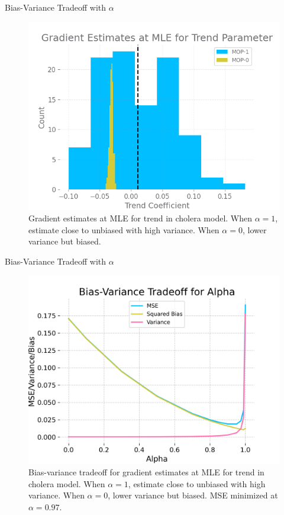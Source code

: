 \documentclass{beamer}
\begin{document}
\begin{frame}{Bias-Variance Tradeoff with $\alpha$}
\begin{figure}
    \centering
    \includegraphics[scale=0.5]{imgs/mlegrad.png}
    \caption{Gradient estimates at MLE for trend in \cite{king08} cholera model. When $\alpha=1$, estimate close to unbiased with high variance. When $\alpha=0$, lower variance but biased.}
    \label{fig:bias-variance}
\end{figure}
    
\end{frame}


\begin{frame}{Bias-Variance Tradeoff with $\alpha$}
\begin{figure}
    \centering
    \includegraphics[scale=0.5]{imgs/095/biasvar.png}
    \caption{Bias-variance tradeoff for gradient estimates at MLE for trend in \cite{king08} cholera model. When $\alpha=1$, estimate close to unbiased with high variance. When $\alpha=0$, lower variance but biased. MSE minimized at $\alpha=0.97$.}
    \label{fig:bias-variance}
\end{figure}
    
\end{frame}
\end{document}
